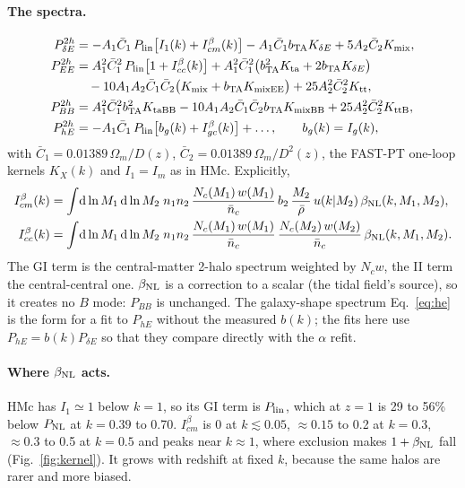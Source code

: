 \documentclass[11pt]{article}
\newcommand{\Plin}{P_{\rm lin}}
\newcommand{\PNL}{P_{\rm NL}}
\newcommand{\bTA}{b_{\rm TA}}
\newcommand{\bNL}{\beta_{\rm NL}}
\newcommand{\Cb}{\bar C_1}
\newcommand{\Cbb}{\bar C_2}
\newcommand{\dd}{\mathrm{d}}
\newcommand{\nbar}{\bar n}
\newcommand{\Ib}[1]{I^{\beta}_{#1}}
\begin{document}
\paragraph{The spectra.}
\begin{align}
P^{2h}_{\delta E} &= -A_1\Cb\,\Plin\big[I_1(k) + \Ib{cm}(k)\big]
  - A_1\Cb\bTA K_{\delta E} + 5A_2\Cbb K_{\rm mix},\label{eq:gi}\\
P^{2h}_{EE} &= A_1^2\Cb^2\,\Plin\big[1 + \Ib{cc}(k)\big]
  + A_1^2\Cb^2\big(\bTA^2K_{\rm ta} + 2\bTA K_{\delta E}\big)\nonumber\\
  &\quad - 10A_1A_2\Cb\Cbb\big(K_{\rm mix} + \bTA K_{\rm mixEE}\big) + 25A_2^2\Cbb^2K_{\rm tt},\label{eq:ii}\\
P^{2h}_{BB} &= A_1^2\Cb^2\bTA^2K_{\rm taBB} - 10A_1A_2\Cb\Cbb\bTA K_{\rm mixBB}
  + 25A_2^2\Cbb^2K_{\rm ttB},\label{eq:bb}\\
P^{2h}_{hE} &= -A_1\Cb\,\Plin\big[b_g(k) + \Ib{gc}(k)\big] + \dots,
  \qquad b_g(k) = I_g(k),\label{eq:he}
\end{align}
with $\Cb = 0.01389\,\Omega_m/D(z)$, $\Cbb = 0.01389\,\Omega_m/D^2(z)$, the
FAST-PT one-loop kernels $K_X(k)$ and $I_1 = I_m$ as in HMc. Explicitly,
\begin{align}
\Ib{cm}(k) &= \int\!\dd\ln M_1\,\dd\ln M_2\; n_1 n_2\,\frac{N_c(M_1)\,w(M_1)}{\nbar_c}\,
b_2\,\frac{M_2}{\bar\rho}\,u(k|M_2)\,\bNL(k, M_1, M_2),\\
\Ib{cc}(k) &= \int\!\dd\ln M_1\,\dd\ln M_2\; n_1 n_2\,\frac{N_c(M_1)\,w(M_1)}{\nbar_c}\,
\frac{N_c(M_2)\,w(M_2)}{\nbar_c}\,\bNL(k, M_1, M_2).
\end{align}
The GI term is the central-matter 2-halo spectrum weighted by $N_c w$, the II
term the central-central one. $\bNL$ is a correction to a scalar (the tidal
field's source), so it creates no $B$ mode: $P_{BB}$ is unchanged. The
galaxy-shape spectrum Eq.~\eqref{eq:he} is the form for a fit to $P_{hE}$
without the measured $b(k)$; the fits here use $P_{hE} = b(k)P_{\delta E}$ so
that they compare directly with the $\alpha$ refit.

\paragraph{Where $\bNL$ acts.} HMc has $I_1 \simeq 1$ below $k = 1$, so its
GI term is $\Plin$, which at $z = 1$ is 29 to 56\% below $\PNL$ at
$k = 0.39$ to 0.70. $\Ib{cm}$ is 0 at $k \lesssim 0.05$, $\approx 0.15$ to 0.2
at $k = 0.3$, $\approx 0.3$ to 0.5 at $k = 0.5$ and peaks near $k \approx 1$,
where exclusion makes $1 + \bNL$ fall (Fig.~\ref{fig:kernel}). It grows with
redshift at fixed $k$, because the same halos are rarer and more biased.
\end{document}
